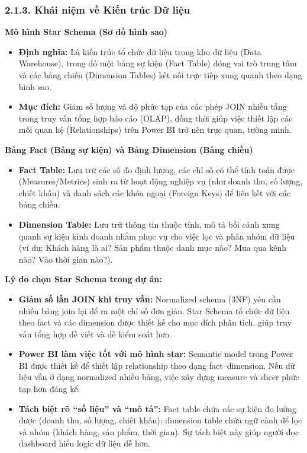 \documentclass[12pt,a4paper]{article}
\begin{document}
\subsubsection{2.1.3. Khái niệm về Kiến trúc Dữ liệu}

\textbf{Mô hình Star Schema (Sơ đồ hình sao)}

\begin{itemize}
    \item \textbf{Định nghĩa:} Là kiến trúc tổ chức dữ liệu trong kho dữ liệu (Data Warehouse), trong đó một bảng sự kiện (Fact Table) đóng vai trò trung tâm và các bảng chiều (Dimension Tables) kết nối trực tiếp xung quanh theo dạng hình sao.
    \item \textbf{Mục đích:} Giảm số lượng và độ phức tạp của các phép JOIN nhiều tầng trong truy vấn tổng hợp báo cáo (OLAP), đồng thời giúp việc thiết lập các mối quan hệ (Relationships) trên Power BI trở nên trực quan, tường minh.
\end{itemize}

\textbf{Bảng Fact (Bảng sự kiện) và Bảng Dimension (Bảng chiều)}

\begin{itemize}
    \item \textbf{Fact Table:} Lưu trữ các số đo định lượng, các chỉ số có thể tính toán được (Measures/Metrics) sinh ra từ hoạt động nghiệp vụ (như doanh thu, số lượng, chiết khấu) và danh sách các khóa ngoại (Foreign Keys) để liên kết với các bảng chiều.
    \item \textbf{Dimension Table:} Lưu trữ thông tin thuộc tính, mô tả bối cảnh xung quanh sự kiện kinh doanh nhằm phục vụ cho việc lọc và phân nhóm dữ liệu (ví dụ: Khách hàng là ai? Sản phẩm thuộc danh mục nào? Mua qua kênh nào? Vào thời gian nào?).
\end{itemize}

\textbf{Lý do chọn Star Schema trong dự án:}

\begin{itemize}
    \item \textbf{Giảm số lần JOIN khi truy vấn:} Normalized schema (3NF) yêu cầu nhiều bảng join lại để ra một chỉ số đơn giản. Star Schema tổ chức dữ liệu theo fact và các dimension được thiết kế cho mục đích phân tích, giúp truy vấn tổng hợp dễ viết và dễ kiểm soát hơn.
    \item \textbf{Power BI làm việc tốt với mô hình star:} Semantic model trong Power BI được thiết kế để thiết lập relationship theo dạng fact--dimension. Nếu dữ liệu vẫn ở dạng normalized nhiều bảng, việc xây dựng measure và slicer phức tạp hơn đáng kể.
    \item \textbf{Tách biệt rõ ``số liệu'' và ``mô tả'':} Fact table chứa các sự kiện đo lường được (doanh thu, số lượng, chiết khấu); dimension table chứa ngữ cảnh để lọc và nhóm (khách hàng, sản phẩm, thời gian). Sự tách biệt này giúp người đọc dashboard hiểu logic dữ liệu dễ hơn.
\end{itemize}
\end{document}

